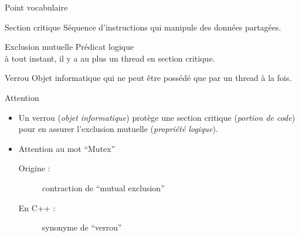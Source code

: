 
\begingroup

\begin{frame}[fragile]{Point vocabulaire}

  \vspace{-1mm}
  \begin{block}{Section critique}
    Séquence d'instructions qui manipule des données partagées.
  \end{block}

  \begin{block}{Exclusion mutuelle}
    Prédicat logique \\ \og à tout instant, il y a au plus un thread en section critique\fg.
  \end{block}

  \begin{block}{Verrou}
    Objet informatique qui ne peut être possédé que par un thread à la fois.
  \end{block}

  \begin{alertblock}{Attention}
    \begin{itemize}
    \item Un \alert{verrou} (\emph{objet informatique}) protège une
      \alert{section critique} (\emph{portion de code})
      pour en assurer l'\alert{exclusion mutuelle} (\emph{propriété logique}).
    \item Attention au mot ``Mutex''
      \begin{description}
      \item[Origine :] contraction de ``mutual exclusion''
      \item[En C++ :] synonyme de ``verrou''
      \end{description}
    \end{itemize}
  \end{alertblock}
  \vfill
\end{frame}

\endgroup
\endinput
